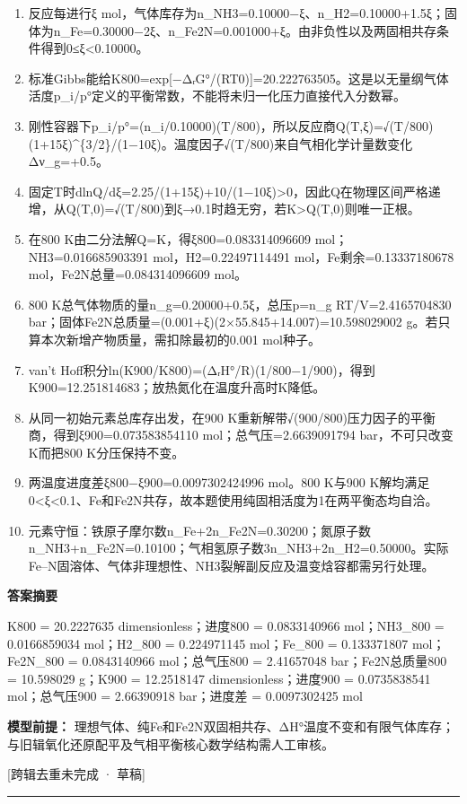 \documentclass[UTF8,11pt,a4paper]{ctexart}
\begin{document}
\begin{enumerate}
\item 反应每进行ξ mol，气体库存为n\_NH3=0.10000−ξ、n\_H2=0.10000+1.5ξ；固体为n\_Fe=0.30000−2ξ、n\_Fe2N=0.001000+ξ。由非负性以及两固相共存条件得到0≤ξ<0.10000。
\item 标准Gibbs能给K800=exp[−ΔᵣG°/(RT0)]=20.222763505。这是以无量纲气体活度p\_i/p°定义的平衡常数，不能将未归一化压力直接代入分数幂。
\item 刚性容器下p\_i/p°=(n\_i/0.10000)(T/800)，所以反应商Q(T,ξ)=√(T/800)(1+15ξ)\textasciicircum{}\{3/2\}/(1−10ξ)。温度因子√(T/800)来自气相化学计量数变化Δν\_g=+0.5。
\item 固定T时dlnQ/dξ=2.25/(1+15ξ)+10/(1−10ξ)>0，因此Q在物理区间严格递增，从Q(T,0)=√(T/800)到ξ→0.1时趋无穷，若K>Q(T,0)则唯一正根。
\item 在800 K由二分法解Q=K，得ξ800=0.083314096609 mol；NH3=0.016685903391 mol，H2=0.22497114491 mol，Fe剩余=0.13337180678 mol，Fe2N总量=0.084314096609 mol。
\item 800 K总气体物质的量n\_g=0.20000+0.5ξ，总压p=n\_g RT/V=2.4165704830 bar；固体Fe2N总质量=(0.001+ξ)(2×55.845+14.007)=10.598029002 g。若只算本次新增产物质量，需扣除最初的0.001 mol种子。
\item van’t Hoff积分ln(K900/K800)=(ΔᵣH°/R)(1/800−1/900)，得到K900=12.251814683；放热氮化在温度升高时K降低。
\item 从同一初始元素总库存出发，在900 K重新解带√(900/800)压力因子的平衡商，得到ξ900=0.073583854110 mol；总气压=2.6639091794 bar，不可只改变K而把800 K分压保持不变。
\item 两温度进度差ξ800−ξ900=0.0097302424996 mol。800 K与900 K解均满足0<ξ<0.1、Fe和Fe2N共存，故本题使用纯固相活度为1在两平衡态均自洽。
\item 元素守恒：铁原子摩尔数n\_Fe+2n\_Fe2N=0.30200；氮原子数n\_NH3+n\_Fe2N=0.10100；气相氢原子数3n\_NH3+2n\_H2=0.50000。实际Fe–N固溶体、气体非理想性、NH3裂解副反应及温变焓容都需另行处理。
\end{enumerate}
\noindent\textbf{答案摘要}\par
K800 = 20.2227635 dimensionless；进度800 = 0.0833140966 mol；NH3\_800 = 0.0166859034 mol；H2\_800 = 0.224971145 mol；Fe\_800 = 0.133371807 mol；Fe2N\_800 = 0.0843140966 mol；总气压800 = 2.41657048 bar；Fe2N总质量800 = 10.598029 g；K900 = 12.2518147 dimensionless；进度900 = 0.0735838541 mol；总气压900 = 2.66390918 bar；进度差 = 0.0097302425 mol\par
\noindent\textbf{模型前提：}
理想气体、纯Fe和Fe2N双固相共存、ΔH°温度不变和有限气体库存；与旧辑氧化还原配平及气相平衡核心数学结构需人工审核。\par
\noindent\textcolor{red!65!black}{[跨辑去重未完成 · 草稿]} \par
\medskip\hrule\medskip
{}
\end{document}

